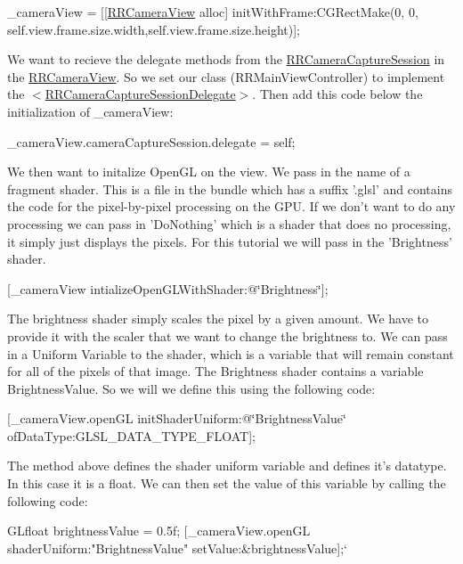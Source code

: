 {\ttfamily \-\_\-camera\-View = \mbox{[}\mbox{[}\hyperlink{interface_r_r_camera_view}{R\-R\-Camera\-View} alloc\mbox{]} init\-With\-Frame\-:C\-G\-Rect\-Make(0, 0, self.\-view.\-frame.\-size.\-width,self.\-view.\-frame.\-size.\-height)\mbox{]};}

We want to recieve the delegate methods from the \hyperlink{interface_r_r_camera_capture_session}{R\-R\-Camera\-Capture\-Session} in the \hyperlink{interface_r_r_camera_view}{R\-R\-Camera\-View}. So we set our class (R\-R\-Main\-View\-Controller) to implement the {\ttfamily $<$\hyperlink{protocol_r_r_camera_capture_session_delegate-p}{R\-R\-Camera\-Capture\-Session\-Delegate}$>$}. Then add this code below the initialization of {\ttfamily \-\_\-camera\-View}\-:

{\ttfamily \-\_\-camera\-View.\-camera\-Capture\-Session.\-delegate = self;}

We then want to initalize Open\-G\-L on the view. We pass in the name of a fragment shader. This is a file in the bundle which has a suffix '.glsl' and contains the code for the pixel-\/by-\/pixel processing on the G\-P\-U. If we don't want to do any processing we can pass in 'Do\-Nothing' which is a shader that does no processing, it simply just displays the pixels. For this tutorial we will pass in the 'Brightness' shader.

{\ttfamily \mbox{[}\-\_\-camera\-View intialize\-Open\-G\-L\-With\-Shader\-:@\char`\"{}\-Brightness\char`\"{}\mbox{]};}

The brightness shader simply scales the pixel by a given amount. We have to provide it with the scaler that we want to change the brightness to. We can pass in a Uniform Variable to the shader, which is a variable that will remain constant for all of the pixels of that image. The Brightness shader contains a variable {\ttfamily Brightness\-Value}. So we will we define this using the following code\-:

{\ttfamily \mbox{[}\-\_\-camera\-View.\-open\-G\-L init\-Shader\-Uniform\-:@\char`\"{}\-Brightness\-Value\char`\"{} of\-Data\-Type\-:G\-L\-S\-L\-\_\-\-D\-A\-T\-A\-\_\-\-T\-Y\-P\-E\-\_\-\-F\-L\-O\-A\-T\mbox{]};}

The method above defines the shader uniform variable and defines it's datatype. In this case it is a float. We can then set the value of this variable by calling the following code\-:

{\ttfamily G\-Lfloat brightness\-Value = 0.\-5f; }\mbox{[}\-\_\-camera\-View.\-open\-G\-L shader\-Uniform\-:"Brightness\-Value" set\-Value\-:\&brightness\-Value\mbox{]};`

